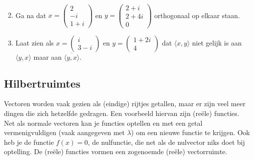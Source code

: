 \documentclass[../main.tex]{subfiles}
\begin{document}
\begin{opdrachtlang}
\begin{enumerate}
\begin{align*}
    \end{align*}
    \item Ga na dat $x=\begin{pmatrix}2\\-i\\1+i\end{pmatrix}$ en $y=\begin{pmatrix}2+i\\2+4i\\0\end{pmatrix}$ orthogonaal op elkaar staan.
    \item Laat zien als $x=\begin{pmatrix}i\\3-i\end{pmatrix}$ en $y=\begin{pmatrix}1+2i\\4\end{pmatrix}$ dat $\langle x,y\rangle$ niet gelijk is aan $\langle y, x\rangle$ maar aan  $\overline{\langle y,x\rangle}$.
\end{enumerate}
\end{opdrachtlang}

\subsection*{Hilbertruimtes}
Vectoren worden vaak gezien als (eindige) rijtjes getallen, maar er zijn veel meer dingen die zich hetzelfde gedragen. 
Een voorbeeld hiervan zijn (reële) functies.
Net als normale vectoren kan je functies optellen en met een getal vermenigvuldigen (vaak aangegeven met $\lambda$) om een nieuwe functie te krijgen.
Ook heb je de functie $f(x)=0$, de nulfunctie, die net als de nulvector niks doet bij optelling. De (reële) functies vormen een zogenoemde (reële) vectorruimte.
\end{document}
